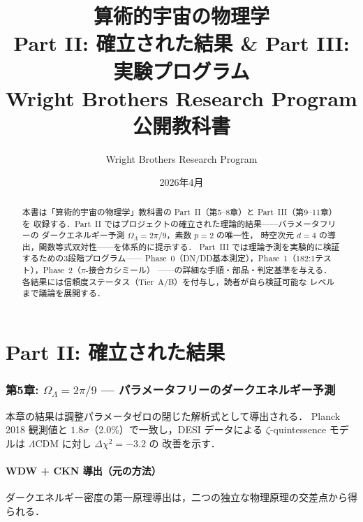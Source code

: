 \documentclass[11pt,a4paper]{article}
\title{算術的宇宙の物理学\\
\large Part II: 確立された結果 \& Part III: 実験プログラム\\[1em]
\normalsize Wright Brothers Research Program 公開教科書}
\author{Wright Brothers Research Program}
\date{2026年4月}
\begin{document}
\maketitle

\begin{abstract}
本書は「算術的宇宙の物理学」教科書の Part~II（第5--8章）と Part~III（第9--11章）を
収録する．Part~II ではプロジェクトの確立された理論的結果——パラメータフリーの
ダークエネルギー予測 $\Omega_\Lambda = 2\pi/9$，素数 $p=2$ の唯一性，
時空次元 $d=4$ の導出，関数等式双対性——を体系的に提示する．
Part~III では理論予測を実験的に検証するための3段階プログラム——
Phase~0（DN/DD基本測定），Phase~1（182:1テスト），Phase~2（$\pi$-接合カシミール）
——の詳細な手順・部品・判定基準を与える．
各結果には信頼度ステータス（Tier~A/B）を付与し，読者が自ら検証可能な
レベルまで議論を展開する．
\end{abstract}

\tableofcontents
\newpage


\part*{Part II: 確立された結果}

\section{第5章: $\Omega_\Lambda = 2\pi/9$ — パラメータフリーのダークエネルギー予測}

\begin{statusbox}
本章の結果は調整パラメータゼロの閉じた解析式として導出される．
Planck 2018 観測値と $1.8\sigma$（2.0\%）で一致し，DESI データによる
$\zeta$-quintessence モデルは $\Lambda$CDM に対し $\Delta\chi^2 = -3.2$ の
改善を示す．
\end{statusbox}

\subsection{WDW + CKN 導出（元の方法）}

ダークエネルギー密度の第一原理導出は，二つの独立な物理原理の交差点から得られる．
\end{document}
